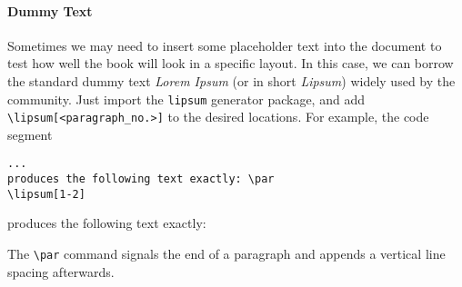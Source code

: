 \paragraph{Dummy Text}
Sometimes we may need to insert some placeholder text into the document to test how well the book will look in a specific layout. In this case, we can borrow the standard dummy text \textit{Lorem Ipsum} (or in short \textit{Lipsum}) widely used by the community. Just import the \verb|lipsum| generator package, and add \texttt{\textbackslash lipsum[<paragraph\_no.>]} to the desired locations. For example, the code segment
\begin{lstlisting}
...
produces the following text exactly: \par
\lipsum[1-2]
\end{lstlisting}
produces the following text exactly: \par
\lipsum[1-2] \par
The \texttt{\textbackslash par} command signals the end of a paragraph and appends a vertical line spacing afterwards. 